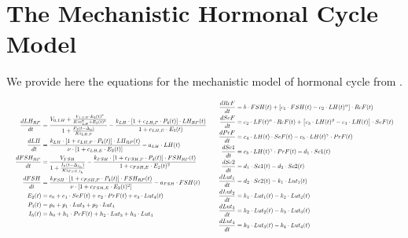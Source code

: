 \documentclass{article}
\begin{document}
\appendix
\section{The Mechanistic Hormonal Cycle Model}
\label{app:mech_model}

We provide here the equations for the mechanistic model of hormonal cycle from \citet{j-Clark2003}.

\begin{equation}
\resizebox{\textwidth}{!}
{$
        \begin{aligned}[c]
        \frac{dLH_{RP}}{dt} &= \frac{V_{0,LH}+\frac{ V_{1,LH} \cdot E_2(t)^8}{Km_{LH}^8+E_2(t)^8}}{1+\frac{P_4(t-\Delta_p)}{Ki_{LH,P}}}-\frac{k_{LH} \cdot \left[1+c_{LH,P} \cdot P_4(t)\right] \cdot LH_{RP}(t)}{1+c_{LH,E} \cdot E_2(t)} \\
        \frac{dLH}{dt} &=\frac{k_{LH}\cdot \left[1+c_{LH,P} \cdot P_4(t)\right]\cdot LH_{RP}(t)}{\nu \cdot \left[1+c_{LH,E} \cdot E_2(t)\right]} - a_{LH} \cdot LH(t)  \\
        \frac{dFSH_{RP}}{dt} &= \frac{V_{FSH}}{1+\frac{I_h(t-\Delta_{I_h})}{Ki_{FSH,I_h}}}-\frac{k_{FSH}\cdot\left[1+c_{FSH,P} \cdot P_4(t)\right] \cdot FSH_{RP}(t)}{1+ c_{FSH,E} \cdot E_2(t)^2} \\
        \frac{dFSH}{dt} &= \frac{k_{FSH}\cdot\left[1+c_{FSH,P} \cdot P_4(t)\right] \cdot FSH_{RP}(t)}{\nu \cdot \left[1+ c_{FSH,E} \cdot E_2(t)^2\right]} - a_{FSH} \cdot FSH(t) \\
        E_2(t)&=e_0+e_1 \cdot SeF(t) + e_2 \cdot PrF(t) + e_3 \cdot Lut_4(t) \\
        P_4(t)&=p_0+p_1 \cdot Lut_3 + p_2 \cdot Lut_4 \\
        I_h(t)&=h_0+h_1 \cdot PrF(t) + h_2 \cdot Lut_3 + h_3 \cdot Lut_4 \\
        \end{aligned}
        \qquad 
        \begin{aligned}[c]
        \frac{dRcF}{dt} &= b \cdot FSH(t)+\left[c_1 \cdot FSH(t) - c_2 \cdot LH(t)^{\alpha}\right] \cdot RcF(t) \\
        \frac{dSeF}{dt} &= c_2 \cdot LF(t)^{\alpha} \cdot RcF(t) + \left[c_3 \cdot LH(t)^{\beta}-c_4 \cdot LH(t) \right] \cdot SeF(t) \\
        \frac{dPrF}{dt} &= c_4 \cdot LH(t) \cdot SeF(t) - c_5 \cdot LH(t)^{\gamma} \cdot PrF(t) \\
        \frac{dSc1}{dt} &= c_5 \cdot LH(t)^{\gamma} \cdot PrF(t) - d_1 \cdot Sc1(t) \\
        \frac{dSc2}{dt} &= d_1 \cdot Sc1(t) - d_2 \cdot Sc2(t) \\
        \frac{dLut_1}{dt} &= d_2 \cdot Sc2(t) - k_1\cdot Lut_1(t) \\
        \frac{dLut_2}{dt} &= k_1 \cdot Lut_1(t) - k_2 \cdot Lut_2(t) \\
        \frac{dLut_3}{dt} &= k_2 \cdot Lut_2(t) - k_3 \cdot Lut_3(t) \\
        \frac{dLut_4}{dt} &= k_3 \cdot Lut_3(t) - k_4 \cdot Lut_4(t) \\
        \end{aligned}
        $}
\label{eq:hmc_model}
\end{equation}
\end{document}
